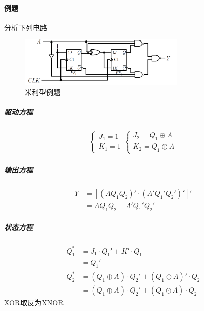 \documentclass[scheme=chinese,a4paper]{report}
\begin{document}
\paragraph{例题} 分析下列电路
\begin{figure}[H]
\centering
\includegraphics[width=0.7\textwidth]{sync_example_2.png}
\caption{米利型例题}
\end{figure}
\subparagraph{驱动方程}
\begin{align*}
    \begin{cases}
        J_1=1\\
        K_1=1
    \end{cases}
    \begin{cases}
        J_2=Q_1\oplus A\\
        K_2=Q_1\oplus A
    \end{cases}
\end{align*}
\subparagraph{输出方程}
\begin{align*}
    Y&=[(AQ_1 Q_2)'\cdot (A'Q_1'Q_2')']'\\
    &=AQ_1 Q_2+A'Q_1' Q_2'
\end{align*}
\subparagraph{状态方程}
\begin{align*}
    Q^*_1&=J_1\cdot Q_1'+K'\cdot Q_1\\
    &=Q_1'\\
    Q^*_2&=(Q_1\oplus A)\cdot Q_2'+(Q_1\oplus A)'\cdot Q_2\\
    &=(Q_1\oplus A)\cdot Q_2'+(Q_1\odot A)\cdot Q_2
\end{align*}
XOR取反为XNOR
\end{document}
